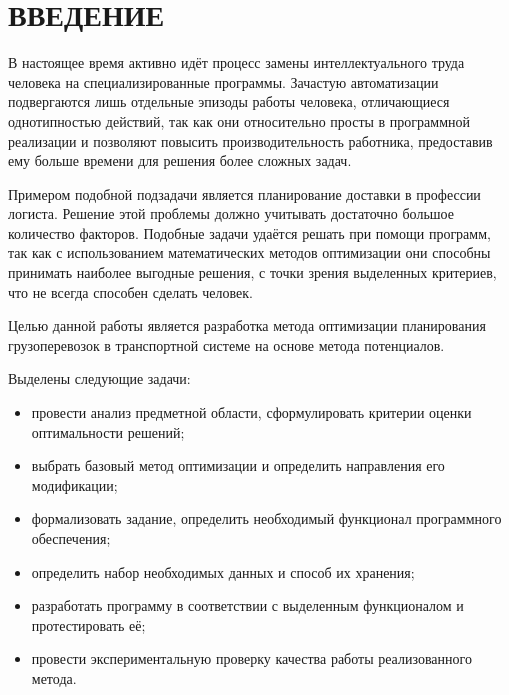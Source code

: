 \section*{ВВЕДЕНИЕ}

В настоящее время активно идёт процесс замены интеллектуального труда человека на специализированные программы. Зачастую автоматизации подвергаются лишь отдельные эпизоды работы человека, отличающиеся однотипностью действий, так как они относительно просты в программной реализации и позволяют повысить производительность работника, предоставив ему больше времени для решения более сложных задач.

Примером подобной подзадачи является планирование доставки в профессии логиста. Решение этой проблемы должно учитывать достаточно большое количество факторов. Подобные задачи удаётся решать при помощи программ, так как с использованием математических методов оптимизации они способны принимать наиболее выгодные решения, с точки зрения выделенных критериев, что не всегда способен сделать человек.

Целью данной работы является разработка метода оптимизации планирования грузоперевозок в транспортной системе на основе метода потенциалов.

Выделены следующие задачи:
\begin{itemize}
	\item провести анализ предметной области, сформулировать критерии оценки оптимальности решений;
	\item выбрать базовый метод оптимизации и определить направления его модификации;
	\item формализовать задание, определить необходимый функционал программного обеспечения;
	\item определить набор необходимых данных и способ их хранения;
	\item разработать программу в соответствии с выделенным функционалом и протестировать её;
	\item провести экспериментальную проверку качества работы реализованного метода.
\end{itemize}

\pagebreak